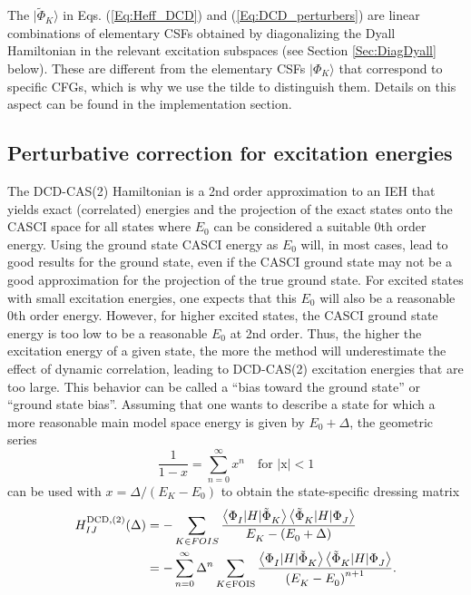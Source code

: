 The $|{\tilde \Phi _K}\rangle $ in Eqs. (\ref{Eq:Heff_DCD}) and (\ref{Eq:DCD_perturbers}) are linear combinations of elementary CSFs obtained by diagonalizing the Dyall Hamiltonian in the relevant excitation subspaces (see Section \ref{Sec:DiagDyall} below). These are different from the elementary CSFs $|{\Phi _K}\rangle $ that correspond to specific CFGs, which is why we use the tilde to distinguish them. Details on this aspect can be found in the implementation section.



\subsection{Perturbative correction for excitation energies}
\label{Sec:PerturbativeCorr}
The DCD-CAS(2) Hamiltonian is a 2nd order approximation to an IEH that yields exact (correlated) energies and the projection of the exact states onto the CASCI space for all states where ${E_0}$ can be considered a suitable 0th order energy. Using the ground state CASCI energy as ${E_0}$ will, in most cases, lead to good results for the ground state, even if the CASCI ground state may not be a good approximation for the projection of the true ground state. For excited states with small excitation energies, one expects that this ${E_0}$ will also be a reasonable 0th order energy. However, for higher excited states, the CASCI ground state energy is too low to be a reasonable ${E_0}$ at 2nd order. Thus, the higher the excitation energy of a given state, the more the method will underestimate the effect of dynamic correlation, leading to DCD-CAS(2) excitation energies that are too large. This behavior can be called a ``bias toward the ground state'' or ``ground state bias''.
Assuming that one wants to describe a state for which a more reasonable main model space energy is given by ${E_0} + \Delta $, the geometric series
\begin{equation}
\label{Eq:geometricseries}
\frac{1}{{1 - x}} = \sum\limits_{n = 0}^\infty  {{x^n}} \quad {\text{for |x|}} < 1
\end{equation}								
can be used with $x=\Delta/(E_K - E_0)$ to obtain the state-specific dressing matrix
\begin{equation}
\label{Eq:HDCD_statespecific}
\begin{split}
  H_{IJ}^{{\text{DCD}},(2)}(\Delta ) &=  - \sum\limits_{K \in FOIS} {\frac{{\left\langle {\Phi _I^{}|H|\tilde \Phi _K^{}} \right\rangle \left\langle {\tilde \Phi _K^{}|H|\Phi _J^{}} \right\rangle }}{{E_K^{} - (E_0^{} + \Delta )}}}  \hfill \\
  \,\,\,\,\,\,\,\,\,\,\,\,\,\,\,\,\,\,\,\, &=  - \sum\limits_{n = 0}^\infty  {{\Delta ^n}} \sum\limits_{K \in {\text{FOIS}}}^{} {\frac{{\left\langle {\Phi _I^{}|H|\tilde \Phi _K^{}} \right\rangle \left\langle {\tilde \Phi _K^{}|H|\Phi _J^{}} \right\rangle }}{{{{(E_K^{} - E_0^{})}^{n + 1}}}}}.  \hfill \\ 
\end{split} 
\end{equation}				
